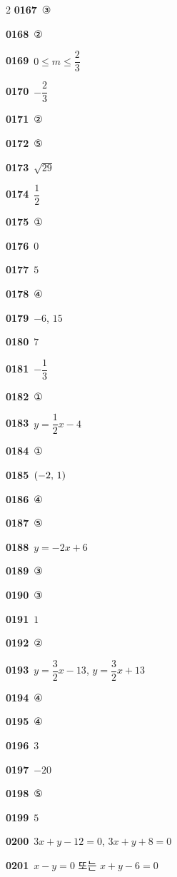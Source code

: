 \documentclass[10pt,a4paper]{article}
\begin{document}
\begin{multicols}{2}
\noindent\textbf{0167}\ ③\par
\noindent\textbf{0168}\ ②\par
\noindent\textbf{0169}\ $0\le m\le\dfrac{2}{3}$\par
\noindent\textbf{0170}\ $-\dfrac{2}{3}$\par
\noindent\textbf{0171}\ ②\par
\noindent\textbf{0172}\ ⑤\par
\noindent\textbf{0173}\ $\sqrt{29}$\par
\noindent\textbf{0174}\ $\dfrac{1}{2}$\par
\noindent\textbf{0175}\ ①\par
\noindent\textbf{0176}\ $0$\par
\noindent\textbf{0177}\ $5$\par
\noindent\textbf{0178}\ ④\par
\noindent\textbf{0179}\ $-6$, $15$\par
\noindent\textbf{0180}\ $7$\par
\noindent\textbf{0181}\ $-\dfrac{1}{3}$\par
\noindent\textbf{0182}\ ①\par
\noindent\textbf{0183}\ $y=\dfrac{1}{2}x-4$\par
\noindent\textbf{0184}\ ①\par
\noindent\textbf{0185}\ $(-2,\mkern3mu 1)$\par
\noindent\textbf{0186}\ ④\par
\noindent\textbf{0187}\ ⑤\par
\noindent\textbf{0188}\ $y=-2x+6$\par
\noindent\textbf{0189}\ ③\par
\noindent\textbf{0190}\ ③\par
\noindent\textbf{0191}\ $1$\par
\noindent\textbf{0192}\ ②\par
\noindent\textbf{0193}\ $y=\dfrac{3}{2}x-13$, $y=\dfrac{3}{2}x+13$\par
\noindent\textbf{0194}\ ④\par
\noindent\textbf{0195}\ ④\par
\noindent\textbf{0196}\ $3$\par
\noindent\textbf{0197}\ $-20$\par
\noindent\textbf{0198}\ ⑤\par
\noindent\textbf{0199}\ $5$\par
\noindent\textbf{0200}\ $3x+y-12=0$, $3x+y+8=0$\par
\noindent\textbf{0201}\ $x-y=0$ 또는 $x+y-6=0$\par

\end{multicols}
\end{document}
